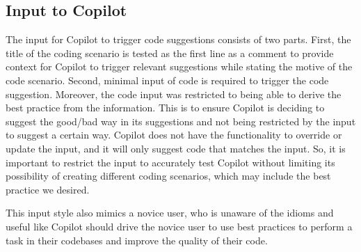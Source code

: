 \subsection{Input to Copilot}
\label{input}
The input for Copilot to trigger code suggestions consists of two parts.
First, the title of the coding scenario is tested as the first line as a comment to provide context for Copilot to trigger relevant suggestions while stating the motive of the code scenario. 
Second, minimal input of code is required to trigger the code suggestion. Moreover, the code input was restricted to being able to derive the best practice from the information. 
This is to ensure Copilot is deciding to suggest the good/bad way in its suggestions and not being restricted by the input to suggest a certain way. 
Copilot does not have the functionality to override or update the input, and it will only suggest code that matches the input. So, it is important to restrict the input to accurately test Copilot without limiting its possibility of creating different coding scenarios, which may include the best practice we desired.

This input style also mimics a novice user, who is unaware of the idioms and useful \cct{} like Copilot should drive the novice user to use best practices to perform a task in their codebases and improve the quality of their code.